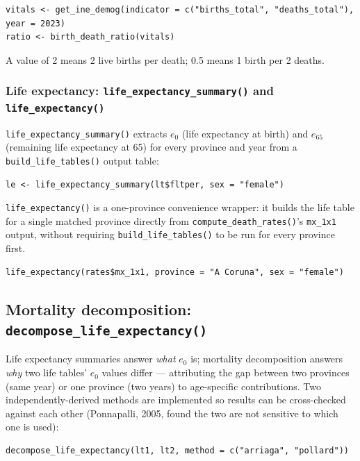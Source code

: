 \documentclass[11pt]{article}
\newcommand{\fn}[1]{\texttt{#1}}
\begin{document}
\begin{lstlisting}
vitals <- get_ine_demog(indicator = c("births_total", "deaths_total"), year = 2023)
ratio <- birth_death_ratio(vitals)
\end{lstlisting}

A value of 2 means 2 live births per death; 0.5 means 1 birth per 2 deaths.

\subsubsection{Life expectancy: \fn{life\_expectancy\_summary()} and \fn{life\_expectancy()}}

\fn{life\_expectancy\_summary()} extracts $e_0$ (life expectancy at birth)
and $e_{65}$ (remaining life expectancy at 65) for every province and year
from a \fn{build\_life\_tables()} output table:

\begin{lstlisting}
le <- life_expectancy_summary(lt$fltper, sex = "female")
\end{lstlisting}

\fn{life\_expectancy()} is a one-province convenience wrapper: it builds the
life table for a single matched province directly from
\fn{compute\_death\_rates()}'s \fn{mx\_1x1} output, without requiring
\fn{build\_life\_tables()} to be run for every province first.

\begin{lstlisting}
life_expectancy(rates$mx_1x1, province = "A Coruna", sex = "female")
\end{lstlisting}

\subsection{Mortality decomposition: \fn{decompose\_life\_expectancy()}}
\label{sec:decomposition}

Life expectancy summaries answer \emph{what} $e_0$ is; mortality
decomposition answers \emph{why} two life tables' $e_0$ values differ ---
attributing the gap between two provinces (same year) or one province (two
years) to age-specific contributions. Two independently-derived methods are
implemented so results can be cross-checked against each other (Ponnapalli,
2005, found the two are not sensitive to which one is used):

\begin{lstlisting}
decompose_life_expectancy(lt1, lt2, method = c("arriaga", "pollard"))
\end{lstlisting}
\end{document}

